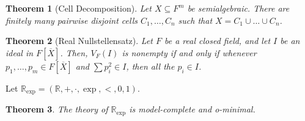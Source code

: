 \documentclass{amsart}
\newtheorem{theorem}{Theorem}[subsection]
\newtheorem{lemma}[theorem]{Lemma}
\newtheorem{corollary}[theorem]{Corollary}
\theoremstyle{definition}
\numberwithin{equation}{section}
\begin{document}

\begin{theorem}[Cell Decomposition]
  Let $X \subseteq F^m$ be semialgebraic.
  There are finitely many pairwise disjoint cells $C_1,\dots,C_n$ such that $X = C_1 \cup \dots \cup C_n$.
\end{theorem}

\begin{theorem}[Real Nullstellensatz]
  Let $F$ be a real closed field,
  and let $I$ be an ideal in $F[\overline{X}]$.
  Then, $V_F(I)$ is nonempty if and only if whenever $p_1,\dots,p_m\in F[\overline{X}]$ and $\sum p_i^2 \in I$,
  then all the $p_i \in I$.
\end{theorem}

Let $\mathbb{R}_{\exp} = (\mathbb{R},+,\cdot,\exp,<,0,1)$.

\begin{theorem}
  The theory of $\mathbb{R}_{\exp}$ is model-complete and o-minimal.
\end{theorem}




\end{document}
